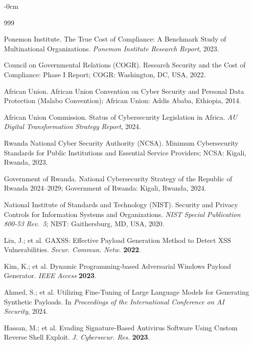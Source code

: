 \documentclass[futureinternet,article,submit,pdftex,moreauthors]{Definitions/mdpi}
\begin{document}
\begin{adjustwidth}{-\extralength}{0cm}


\begin{thebibliography}{999}

Ponemon Institute. The True Cost of Compliance: A Benchmark Study of Multinational
Organizations. \textit{Ponemon Institute Research Report}, 2023.

Council on Governmental Relations (COGR). Research Security and the Cost of Compliance:
Phase I Report; COGR: Washington, DC, USA, 2022.

African Union. African Union Convention on Cyber Security and Personal Data Protection
(Malabo Convention); African Union: Addis Ababa, Ethiopia, 2014.

African Union Commission. Status of Cybersecurity Legislation in Africa.
\textit{AU Digital Transformation Strategy Report}, 2024.

Rwanda National Cyber Security Authority (NCSA). Minimum Cybersecurity Standards for Public
Institutions and Essential Service Providers; NCSA: Kigali, Rwanda, 2023.

Government of Rwanda. National Cybersecurity Strategy of the Republic of Rwanda 2024--2029;
Government of Rwanda: Kigali, Rwanda, 2024.

National Institute of Standards and Technology (NIST). Security and Privacy Controls for
Information Systems and Organizations. \textit{NIST Special Publication 800-53 Rev.\ 5};
NIST: Gaithersburg, MD, USA, 2020.

Liu, J.; et al. GAXSS: Effective Payload Generation Method to Detect XSS Vulnerabilities.
\textit{Secur. Commun. Netw.} \textbf{2022}.

Kim, K.; et al. Dynamic Programming-based Adversarial Windows Payload Generator.
\textit{IEEE Access} \textbf{2023}.

Ahmed, S.; et al. Utilizing Fine-Tuning of Large Language Models for Generating Synthetic
Payloads. In \textit{Proceedings of the International Conference on AI Security}, 2024.

Hassan, M.; et al. Evading Signature-Based Antivirus Software Using Custom Reverse Shell
Exploit. \textit{J. Cybersecur. Res.} \textbf{2023}.


\end{thebibliography}
\end{adjustwidth}
\end{document}
